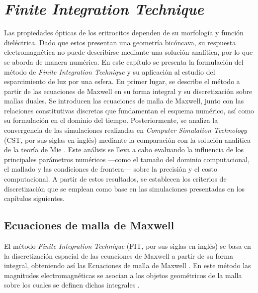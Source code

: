 
\chapter{\textit{Finite Integration Technique}}
\label{chapter:FIT}



Las propiedades ópticas de los eritrocitos dependen de su morfología y función dieléctrica. Dado que estos presentan una geometría bicóncava, su respuesta electromagnética no puede describirse mediante una solución analítica, por lo que se aborda de manera numérica. En este capítulo se presenta la formulación del método de \textit{Finite Integration Technique} y su aplicación al estudio del esparcimiento de luz por una esfera. En primer lugar, se describe el método a partir de las ecuaciones de Maxwell en su forma integral y su discretización sobre mallas duales. Se introducen las ecuaciones de malla de Maxwell, junto con las relaciones constitutivas discretas que fundamentan el esquema numérico, así como su formulación en el dominio del tiempo. Posteriormente, se analiza la convergencia de las simulaciones realizadas en \textit{Computer Simulation Technology} (CST, por sus siglas en inglés) mediante la comparación con la solución analítica de la teoría de Mie \cite{bohrenAbsorptionScatteringLight2008}. Este análisis se lleva a cabo evaluando la influencia de los principales parámetros numéricos —como el tamaño del dominio computacional, el mallado y las condiciones de frontera— sobre la precisión y el costo computacional. A partir de estos resultados, se establecen los criterios de discretización que se emplean como base en las simulaciones presentadas en los capítulos siguientes.




\section{Ecuaciones de malla de Maxwell}
\label{section:MGE}

El método \textit{Finite Integration Technique} (FIT, por sus siglas en inglés) se basa en la discretización espacial de las ecuaciones de Maxwell a partir de su forma integral, obteniendo así las Ecuaciones de malla de Maxwell \cite{clemensDiscreteElectromagnetismFinite2001}. En este método las magnitudes electromagnéticas se asocian a los objetos geométricos de la malla sobre los cuales se definen dichas integrales \cite{dassaultsystemesCSTMicrowaveStudio2003}.

